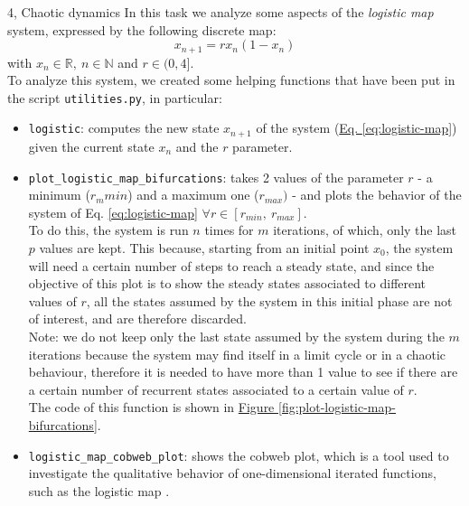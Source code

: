 \documentclass[10pt,a4paper]{article}
\begin{document}
\begin{task}{4, Chaotic dynamics}
In this task we analyze some aspects of the \textit{logistic map} system, expressed by the following discrete map:
\begin{equation}\label{eq:logistic-map}
    x_{n+1} = r x_n (1 - x_n)
\end{equation}
with $x_n \in \mathbb{R},\ n \in \mathbb{N}$ and $r \in (0, 4]$.\\
To analyze this system, we created some helping functions that have been put in the script \texttt{utilities.py}, in particular:
\begin{itemize}
    \item \texttt{logistic}: computes the new state $x_{n+1}$ of the system (\hyperref[eq:logistic-map]{Eq. \ref{eq:logistic-map}}) given the current state $x_n$ and the $r$ parameter.
    
    \item \texttt{plot\_logistic\_map\_bifurcations}: takes 2 values of the parameter $r$ - a minimum ($r_m{min}$) and a maximum one ($r_{max})$ - and plots the behavior of the system of Eq. \ref{eq:logistic-map} $\forall r \in [r_{min},\ r_{max}]$.\\
    To do this, the system is run $n$ times for $m$ iterations, of which, only the last $p$ values are kept.
    This because, starting from an initial point $x_0$, the system will need a certain number of steps to reach a steady state, and since the objective of this plot is to show the steady states associated to different values of $r$, all the states assumed by the system in this initial phase are not of interest, and are therefore discarded.\\
    Note: we do not keep only the last state assumed by the system during the $m$ iterations because the system may find itself in a limit cycle or in a chaotic behaviour, therefore it is needed to have more than 1 value to see if there are a certain number of recurrent states associated to a certain value of $r$.\\
    The code of this function is shown in \hyperref[fig:plot-logistic-map-bifurcations]{Figure \ref{fig:plot-logistic-map-bifurcations}}.
    
    \item \texttt{logistic\_map\_cobweb\_plot}: shows the cobweb plot, which is a tool used to investigate the qualitative behavior of one-dimensional iterated functions, such as the logistic map \cite{cobweb}.
\end{itemize}


\end{task}
\end{document}
